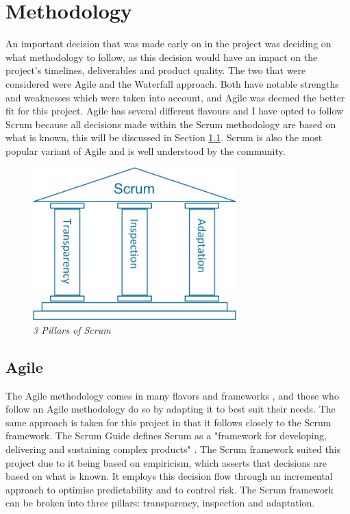 \section{Methodology}
\label{sub:meth}
An important decision that was made early on in the project was deciding on what methodology to follow, as this decision would have an impact on the project's timelines, deliverables and product quality. The two that were considered were Agile and the Waterfall approach. Both have notable strengths and weaknesses which were taken into account, and Agile was deemed the better fit for this project. Agile has several different flavours and I have opted to follow Scrum because all decisions made within the Scrum methodology are based on what is known, this will be discussed in Section \ref{sub:agile}. Scrum is also the most popular variant of Agile \citep{enterprise_2018} and is well understood by the community.

\begin{figure}[!ht]
\centering
\includegraphics*[width=0.7\textwidth]{images/scrum.jpg}
\caption{\em 3 Pillars of Scrum \cite{scrumguide}}
\label{img:scrum-pillar}
\end{figure}

\subsection{Agile}
\label{sub:agile}
The Agile methodology comes in many flavors and frameworks \citep{manifesto}, and those who follow an Agile methodology do so by adapting it to best suit their needs. The same approach is taken for this project in that it follows closely to the Scrum framework. The Scrum Guide defines Scrum as a "framework for developing, delivering and sustaining complex products" \citep{scrum}.
The Scrum framework suited this project due to it being based on empiricism, which asserts that decisions are based on what is known. It employs this decision flow through an incremental approach to optimise predictability and to control risk. The Scrum framework can be broken into three pillars: transparency, inspection and adaptation.

